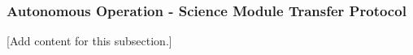 
\subsubsection{Autonomous Operation - Science Module Transfer Protocol}
\label{subsubsec:design_7_6_science_transfer_protocol}

[Add content for this subsection.]
